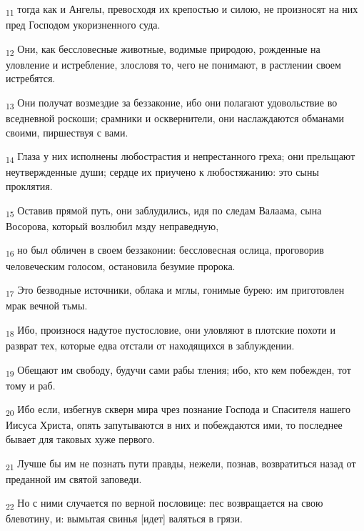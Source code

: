 \begin{tcolorbox}
\textsubscript{11} тогда как и Ангелы, превосходя их крепостью и силою, не произносят на них пред Господом укоризненного суда.
\end{tcolorbox}
\begin{tcolorbox}
\textsubscript{12} Они, как бессловесные животные, водимые природою, рожденные на уловление и истребление, злословя то, чего не понимают, в растлении своем истребятся.
\end{tcolorbox}
\begin{tcolorbox}
\textsubscript{13} Они получат возмездие за беззаконие, ибо они полагают удовольствие во вседневной роскоши; срамники и осквернители, они наслаждаются обманами своими, пиршествуя с вами.
\end{tcolorbox}
\begin{tcolorbox}
\textsubscript{14} Глаза у них исполнены любострастия и непрестанного греха; они прельщают неутвержденные души; сердце их приучено к любостяжанию: это сыны проклятия.
\end{tcolorbox}
\begin{tcolorbox}
\textsubscript{15} Оставив прямой путь, они заблудились, идя по следам Валаама, сына Восорова, который возлюбил мзду неправедную,
\end{tcolorbox}
\begin{tcolorbox}
\textsubscript{16} но был обличен в своем беззаконии: бессловесная ослица, проговорив человеческим голосом, остановила безумие пророка.
\end{tcolorbox}
\begin{tcolorbox}
\textsubscript{17} Это безводные источники, облака и мглы, гонимые бурею: им приготовлен мрак вечной тьмы.
\end{tcolorbox}
\begin{tcolorbox}
\textsubscript{18} Ибо, произнося надутое пустословие, они уловляют в плотские похоти и разврат тех, которые едва отстали от находящихся в заблуждении.
\end{tcolorbox}
\begin{tcolorbox}
\textsubscript{19} Обещают им свободу, будучи сами рабы тления; ибо, кто кем побежден, тот тому и раб.
\end{tcolorbox}
\begin{tcolorbox}
\textsubscript{20} Ибо если, избегнув скверн мира чрез познание Господа и Спасителя нашего Иисуса Христа, опять запутываются в них и побеждаются ими, то последнее бывает для таковых хуже первого.
\end{tcolorbox}
\begin{tcolorbox}
\textsubscript{21} Лучше бы им не познать пути правды, нежели, познав, возвратиться назад от преданной им святой заповеди.
\end{tcolorbox}
\begin{tcolorbox}
\textsubscript{22} Но с ними случается по верной пословице: пес возвращается на свою блевотину, и: вымытая свинья [идет] валяться в грязи.
\end{tcolorbox}
